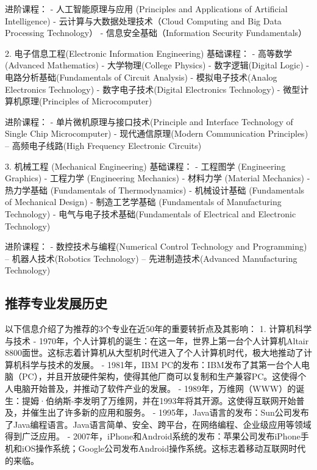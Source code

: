 \documentclass[12pt]{article}
\begin{document}
\begin{CJK*}{UTF8}{gbsn}
   进阶课程：
   - 人工智能原理与应用 (Principles and Applications of Artificial Intelligence)
   - 云计算与大数据处理技术（Cloud Computing and Big Data Processing Technology）
   - 信息安全基础（Information Security Fundamentals）

2. 电子信息工程(Electronic Information Engineering) 
    基础课程：
    - 高等数学(Advanced Mathematics) 
    - 大学物理(College Physics) 
    - 数字逻辑(Digital Logic) 
    - 电路分析基础(Fundamentals of Circuit Analysis) 
    - 模拟电子技术(Analog Electronics Technology) 
    - 数字电子技术(Digital Electronics Technology) 
    - 微型计算机原理(Principles of Microcomputer)

     进阶课程：
     - 单片微机原理与接口技术(Principle and Interface Technology of Single Chip Microcomputer)  
     - 现代通信原理(Modern Communication Principles)  
     – 高频电子线路(High Frequency Electronic Circuits)

3. 机械工程 (Mechanical Engineering)
    基础课程：
    - 工程图学 (Engineering Graphics)
    - 工程力学 (Engineering Mechanics)
    - 材料力学 (Material Mechanics)
    - 热力学基础 (Fundamentals of Thermodynamics)
    - 机械设计基础 (Fundamentals of Mechanical Design)
    - 制造工艺学基础 (Fundamentals of Manufacturing Technology)
    - 电气与电子技术基础(Fundamentals of Electrical and Electronic Technology)

     进阶课程：
     - 数控技术与编程(Numerical Control Technology and Programming) 
     – 机器人技术(Robotics Technology) 
     – 先进制造技术(Advanced Manufacturing Technology)
   
   \newpage
   \subsection*{推荐专业发展历史}
   以下信息介绍了为推荐的3个专业在近50年的重要转折点及其影响：
   1. 计算机科学与技术
   - 1970年，个人计算机的诞生：在这一年，世界上第一台个人计算机Altair 8800面世。这标志着计算机从大型机时代进入了个人计算机时代，极大地推动了计算机科学与技术的发展。
   - 1981年，IBM PC的发布：IBM发布了其第一台个人电脑（PC），并且开放硬件架构，使得其他厂商可以复制和生产兼容PC。这使得个人电脑开始普及，并推动了软件产业的发展。
   - 1989年，万维网（WWW）的诞生：提姆·伯纳斯-李发明了万维网，并在1993年将其开源。这使得互联网开始普及，并催生出了许多新的应用和服务。
   - 1995年，Java语言的发布：Sun公司发布了Java编程语言。Java语言简单、安全、跨平台，在网络编程、企业级应用等领域得到广泛应用。
   - 2007年，iPhone和Android系统的发布：苹果公司发布iPhone手机和iOS操作系统；Google公司发布Android操作系统。这标志着移动互联网时代的来临。


\end{CJK*}
\end{document}
